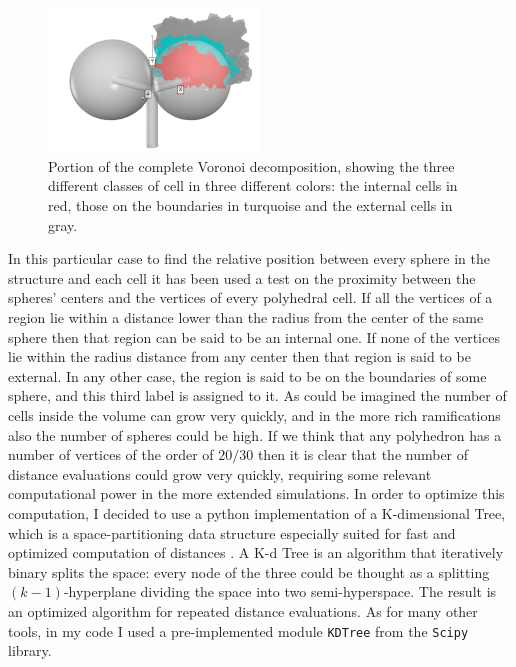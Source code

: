     \begin{figure}
        \centering
        \includegraphics[width = 0.5\textwidth]{images/cell_id}
        \caption{Portion of the complete Voronoi decomposition, showing the three different classes of cell in three different colors: the internal cells in red, those on the boundaries in turquoise and the external cells in gray.}
        \label{fig:cell_id}
    \end{figure}

    In this particular case to find the relative position between every sphere in the structure and each cell it has been used a test on the proximity between the spheres' centers and the vertices of every polyhedral cell. If all the vertices of a region lie within a distance lower than the radius from the center of the same sphere then that region can be said to be an internal one. If none of the vertices lie within the radius distance from any center then that region is said to be external. In any other case, the region is said to be on the boundaries of some sphere, and this third label is assigned to it. As could be imagined the number of cells inside the volume can grow very quickly, and in the more rich ramifications also the number of spheres could be high. If we think that any polyhedron has a number of vertices of the order of $20/30$ then it is clear that the number of distance evaluations could grow very quickly, requiring some relevant computational power in the more extended simulations. In order to optimize this computation, I decided to use a python implementation of a K-dimensional Tree, which is a space-partitioning data structure especially suited for fast and optimized computation of distances \cite{10.1145/361002.361007}. A K-d Tree is an algorithm that iteratively binary splits the space: every node of the three could be thought as a splitting $(k-1)$-hyperplane dividing the space into two semi-hyperspace. The result is an optimized algorithm for repeated distance evaluations. As for many other tools, in my code I used a pre-implemented module \texttt{KDTree} from the \texttt{Scipy} library.

